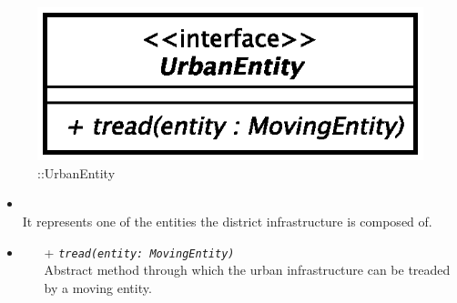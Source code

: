 \begin{figure}[h]
\centering
\includegraphics[scale=0.6,keepaspectratio]{images/solution/urban_entity.eps}
\caption{\pReactiveComponent::UrbanEntity}
\label{fig:sd-app-urban-entity}
\end{figure}
\FloatBarrier
\begin{itemize}
  \item \textbf{\descr} \\
    It represents one of the entities the district infrastructure is composed
    of.
  \item \textbf{\ops}
  \begin{itemize} 
    \item[+] \texttt{\textit{tread(entity: MovingEntity)}} \\
    Abstract method through which the urban infrastructure can be treaded by a
    moving entity.
  \end{itemize}
\end{itemize}
